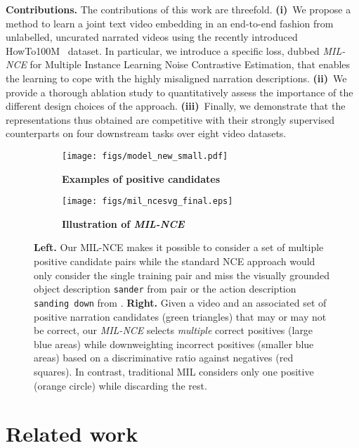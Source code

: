 \documentclass[10pt,twocolumn,letterpaper]{article}
\begin{document}
\noindent
\textbf{Contributions.}
The contributions of this work are threefold.
\textbf{(i)}~We propose a method to learn a joint text video embedding in an end-to-end fashion from unlabelled, uncurated narrated videos using the recently introduced HowTo100M~\cite{miech19howto100m} dataset. 
In particular, we introduce a specific loss, dubbed \emph{MIL-NCE} for Multiple Instance Learning Noise Contrastive Estimation, that enables the learning to cope with the highly misaligned narration descriptions.
\textbf{(ii)}~We provide a thorough ablation study to quantitatively assess the importance of the different design choices of the approach.
\textbf{(iii)}~Finally, we demonstrate that the representations thus obtained are competitive with their strongly supervised counterparts on four downstream tasks over eight video datasets.

\begin{figure*}[t]
      \centering
		\begin{subfigure}[t]{.63\linewidth}
			\centering
		\texttt{[image: figs/model\_new\_small.pdf]}
			\caption{\label{fig:mil_vizu} \small \textbf{Examples of positive candidates}}
		\end{subfigure}
			\hfill
			\begin{subfigure}[t]{.345\linewidth}
		\centering
		\texttt{[image: figs/mil\_ncesvg\_final.eps]}
		\caption{\small \textbf{Illustration of \emph{MIL-NCE}} \label{fig:mil_nce}}
	\end{subfigure}
	\caption{\label{fig:model} \small \textbf{Left.}
Our MIL-NCE makes it possible to consider a set of  multiple positive candidate
pairs  while the standard
NCE approach would only consider the single  training pair
and miss the visually grounded object description
\texttt{sander} from pair  or the action description \texttt{sanding down} from .
\textbf{Right.} 
Given a video  and an associated set of positive narration candidates  (green triangles) that may or may not be correct, our \emph{MIL-NCE} selects \emph{multiple} correct positives (large blue areas) while downweighting incorrect positives (smaller blue areas) based on a discriminative ratio against
negatives  (red squares). In contrast, traditional MIL considers only one positive (orange circle) while discarding the rest. 
}
\end{figure*}

\section{Related work}
\end{document}
